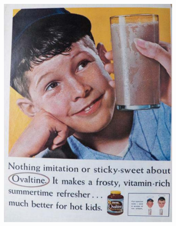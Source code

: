 \documentclass[hidelinks,11pt,a4paper]{report}
\begin{document}
\begin{figure}
    \centering
    \begin{subfigure}[b]{0.3\textwidth}
         \centering
         \includegraphics[width=\textwidth,scale=0.6]{images/humans_concreteness_img1.pdf}
         \caption{}
         

\end{subfigure}
\end{figure}
\end{document}
